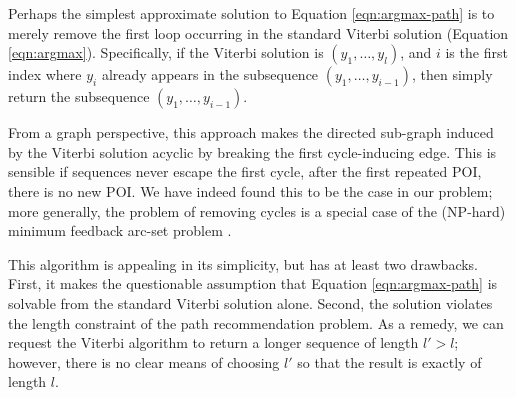 
Perhaps the simplest approximate solution to Equation \ref{eqn:argmax-path} is to merely remove the first loop occurring in the standard Viterbi solution (Equation \ref{eqn:argmax}).
Specifically, if the Viterbi solution is $( y_1, \ldots, y_l )$,
and $i$ is the first index where $y_i$ already appears in the subsequence $( y_1, \ldots, y_{i-1} )$,
then simply return the subsequence $( y_1, \ldots, y_{i-1} )$.

From a graph perspective, this approach makes the directed sub-graph induced by the Viterbi solution acyclic
by breaking the first cycle-inducing edge.
This is sensible if sequences never escape the first cycle, \ie after the first repeated POI, there is no new POI.
We have indeed found this to be the case in our problem; %
more generally, %
the problem of removing cycles is a special case of the ({\sf NP}-hard) minimum feedback arc-set problem \citep[pg.\ 192]{Garey:1990}.

This algorithm is appealing in its simplicity,
but has at least two drawbacks.
First, it makes the questionable assumption that Equation \ref{eqn:argmax-path} is solvable from the standard Viterbi solution alone.
Second, the solution violates the length constraint of the path recommendation problem.
As a remedy, we can request the Viterbi algorithm to return a longer sequence of length $l' > l$;
however, there is no clear means of choosing $l'$ so that the result is exactly of length $l$.

